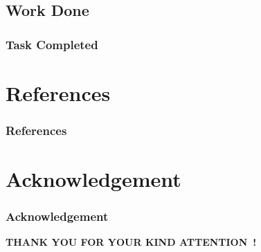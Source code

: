 \documentclass[aspectratio=169,12pt]{beamer}
\newcommand\ftitle[1]{\frametitle{\large\textbf{#1}}}
\begin{document}
\subsection{Work Done}
\begin{frame}
	\ftitle{Task Completed}
\end{frame}



\section{References}

\begin{frame}
	\ftitle{References}
	\printbibliography
\end{frame}


\section{Acknowledgement}

\begin{frame}
	\ftitle{Acknowledgement}
\end{frame}


\begin{frame}
	\centering
	\large
	\textcolor{egyptianblue}{\textbf{THANK YOU FOR YOUR KIND ATTENTION~!}}
\end{frame}
\end{document}
